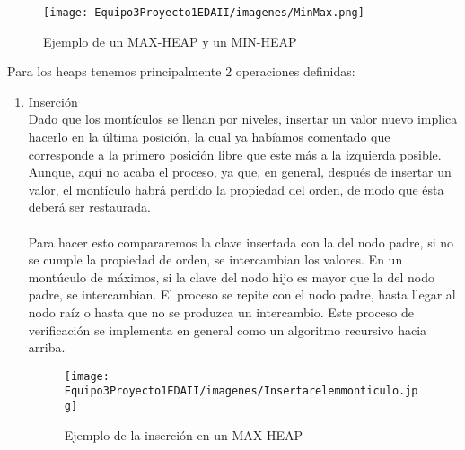 \documentclass{report}
\begin{document}
\begin{figure}[h]
    \centering
    \texttt{[image: Equipo3Proyecto1EDAII/imagenes/MinMax.png]}
    \caption{Ejemplo de un MAX-HEAP y un MIN-HEAP}
    \label{fig:my_label}
\end{figure}
Para los heaps tenemos principalmente 2 operaciones definidas:
\begin{enumerate}
    \item Inserción\\
    Dado que los montículos se llenan por niveles, insertar un valor nuevo implica hacerlo en la última posición, la cual ya habíamos comentado que corresponde a la primero posición libre que este más a la izquierda posible. Aunque, aquí no acaba el proceso, ya que, en general, después de insertar un valor, el montículo habrá perdido la propiedad del orden, de modo que ésta deberá ser restaurada.\\\\
    Para hacer esto compararemos la clave insertada con la del nodo padre, si no se cumple la propiedad de orden, se intercambian los valores. En un montúculo de máximos, si la clave del nodo hijo es mayor que la del nodo padre, se intercambian. El proceso se repite con el nodo padre, hasta llegar al nodo raíz o hasta que no se produzca un intercambio. Este proceso de verificación se implementa en general como un algoritmo recursivo hacia arriba.
    
    \begin{figure}[h]
        \centering
        \texttt{[image: Equipo3Proyecto1EDAII/imagenes/Insertarelemmonticulo.jpg]}
        \caption{Ejemplo de la inserción en un MAX-HEAP}
        \label{fig:my_label}
    \end{figure}


\end{enumerate}
\end{document}
